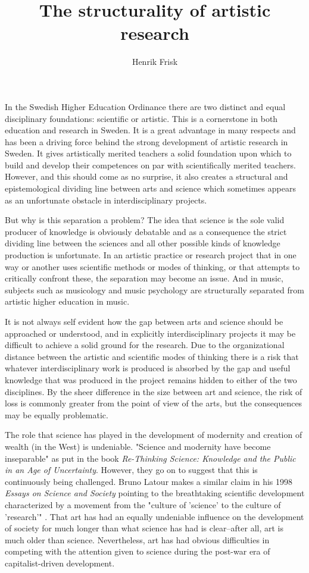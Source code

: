 \documentclass[11pt]{article}
\author{Henrik Frisk}
\date{}
\title{The structurality of artistic research}
\begin{document}
\maketitle
In the Swedish Higher Education Ordinance there are two distinct and equal disciplinary foundations: scientific or artistic. This is a cornerstone in both education and research in Sweden. It is a great advantage in many respects and has been a driving force behind the strong development of artistic research in Sweden. It gives artistically merited teachers a solid foundation upon which to build and develop their competences on par with scientifically merited teachers. However, and this should come as no surprise, it also creates a structural and epistemological dividing line between arts and science which sometimes appears as an unfortunate obstacle in interdisciplinary projects.

But why is this separation a problem? The idea that science is the
sole valid producer of knowledge is obviously debatable and as a
consequence the strict dividing line between the sciences and all
other possible kinds of knowledge production is unfortunate. In an
artistic practice or research project that in one way or another uses
scientific methods or modes of thinking, or that attempts to
critically confront these, the separation may become an issue. And in music, subjects such as musicology and music psychology are structurally separated from artistic higher education in music. 

It is not always self evident how the gap between arts and science should be approached or understood, and in explicitly interdisciplinary projects it may be difficult to achieve a solid ground for the research. Due to the organizational distance between the artistic and scientific modes of thinking there is a risk that whatever interdisciplinary work is produced is absorbed by the gap and useful knowledge that was produced in the project remains hidden to either of the two disciplines. By the sheer difference in the size between art and science, the risk of loss is commonly greater from the point of view of the arts, but the consequences may be equally problematic.

The role that science has played in the development of modernity and
creation of wealth (in the West) is undeniable. "Science and modernity
have become inseparable" \citep{nowotny2013} as put in the book
\emph{Re-Thinking Science: Knowledge and the Public in an Age of
    Uncertainty}. However, they go on to suggest that this is continuously being challenged. Bruno Latour makes a similar claim in his 1998 \emph{Essays on Science and Society} pointing to the breathtaking scientific development characterized by a movement from the "culture of 'science' to the culture of 'research'" \citep{Latour1998}. That art has had an equally undeniable influence on the development of society for much longer than what science has had is clear--after all, art is much older than science. Nevertheless, art has had obvious difficulties in competing with the attention given to science during the post-war era of capitalist-driven development.
\end{document}

